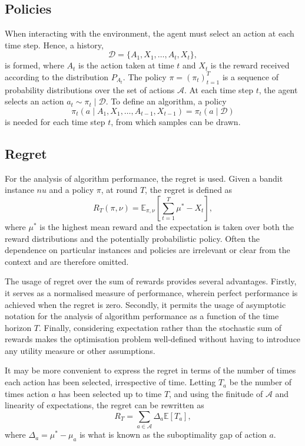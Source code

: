 \subsection{Policies}
When interacting with the environment, the agent must select an action at each time step.
Hence, a history,
\begin{equation}
    \mathcal{D} = \{A_1, X_1, \dots, A_t, X_t\},
\end{equation}
is formed, where $A_t$ is the action taken at time $t$ and $X_t$ is the reward received according to the distribution $P_{A_t}$.
The policy $\pi = (\pi_t)_{t=1}^T$ is a sequence of probability distributions over the set of actions $\mathcal{A}$.
At each time step $t$, the agent selects an action $a_t \sim \pi_t \mid \mathcal{D}$.
To define an algorithm, a policy
\begin{equation}
    \pi_t(a \mid A_1, X_1, \dots, A_{t-1}, X_{t-1}) = \pi_t(a \mid \mathcal{D})
\end{equation}
is needed for each time step $t$, from which samples can be drawn.

\subsection{Regret}
For the analysis of algorithm performance, the regret is used.
Given a bandit instance $nu$ and a policy $\pi$, at round $T$, the regret is defined as
\begin{equation}
    R_T(\pi, \nu) = \mathbb{E}_{\pi, \nu}\left[\sum_{t=1}^T \mu^* - X_t\right],
    \label{eq:regret1}
\end{equation}
where $\mu^*$ is the highest mean reward and the expectation is taken over both the reward distributions and the potentially probabilistic policy.
Often the dependence on particular instances and policies are irrelevant or clear from the context and are therefore omitted.

The usage of regret over the sum of rewards provides several advantages.
Firstly, it serves as a normalised measure of performance, wherein perfect performance is achieved when the regret is zero.
Secondly, it permits the usage of asymptotic notation for the analysis of algorithm performance as a function of the time horizon $T$.
Finally, considering expectation rather than the stochastic sum of rewards makes the optimisation problem well-defined without having to introduce any utility measure or other assumptions.

It may be more convenient to express the regret in terms of the number of times each action has been selected, irrespective of time.
Letting $T_a$ be the number of times action $a$ has been selected up to time $T$, and using the finitude of $\mathcal{A}$ and linearity of expectations, the regret can be rewritten as
\begin{equation}
    R_T = \sum_{a \in \mathcal{A}} \Delta_a  \mathbb{E}[T_a],
    \label{eq:regret2}
\end{equation}
where $\Delta_a = \mu^* - \mu_a$ is what is known as the suboptimality gap of action $a$.
